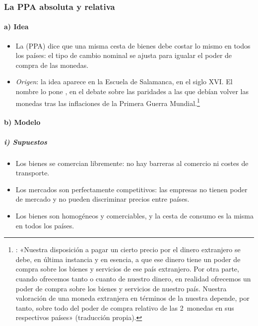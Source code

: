 \documentclass[11pt]{article}
\begin{document}
\subsubsection{La PPA absoluta y relativa}\label{sec:ppa-modelo}

\paragraph{a) Idea}
\begin{itemize}
\item La  (PPA) dice que una misma cesta de bienes debe costar lo mismo en todos los países: el tipo de cambio nominal se ajusta para igualar el poder de compra de las monedas\nocite{TaylorTaylor2004PPP}.
\item \emph{Origen}: la idea aparece en la Escuela de Salamanca, en el siglo XVI\nocite{Azpilcueta1556Cambios,GriceHutchinson1952School}. El nombre lo pone \textcite{Cassel1918Abnormal}, en el debate sobre las paridades a las que debían volver las monedas tras las inflaciones de la Primera Guerra Mundial.\footnote{\textcite[138-139]{Cassel1922Money}: «Nuestra disposición a pagar un cierto precio por el dinero extranjero se debe, en última instancia y en esencia, a que ese dinero tiene un poder de compra sobre los bienes y servicios de ese país extranjero. Por otra parte, cuando ofrecemos tanto o cuanto de nuestro dinero, en realidad ofrecemos un poder de compra sobre los bienes y servicios de nuestro país. Nuestra valoración de una moneda extranjera en términos de la nuestra depende, por tanto, sobre todo del poder de compra relativo de las 2~monedas en sus respectivos países» (traducción propia).}
\end{itemize}

\paragraph{b) Modelo}
\subparagraph{i) Supuestos}
\begin{itemize}
\item Los bienes se comercian libremente: no hay barreras al comercio ni costes de transporte.
\item Los mercados son perfectamente competitivos: las empresas no tienen poder de mercado y no pueden discriminar precios entre países.
\item Los bienes son homogéneos y comerciables, y la cesta de consumo es la misma en todos los países.
\end{itemize}
\end{document}

